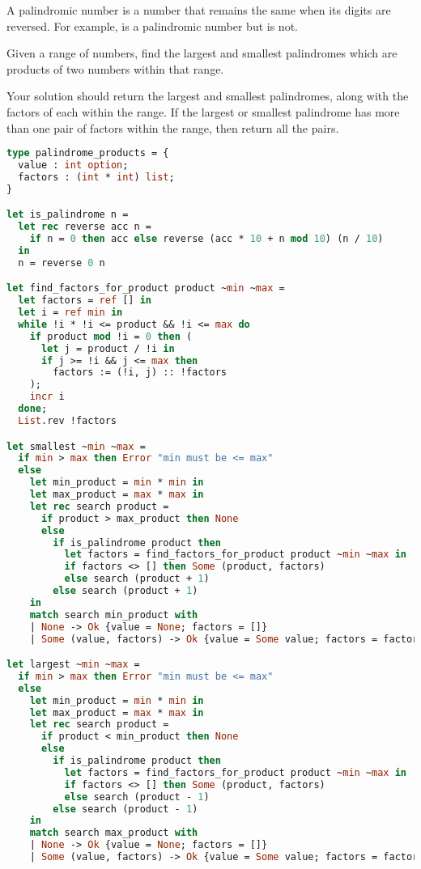 A palindromic number is a number that remains the same when its digits are reversed.
For example,  is a palindromic number but  is not.

Given a range of numbers, find the largest and smallest palindromes which
are products of two numbers within that range.

Your solution should return the largest and smallest palindromes, along with the factors of each within the range.
If the largest or smallest palindrome has more than one pair of factors within the range, then return all the pairs.

\begin{lstlisting}[language=OCaml]
type palindrome_products = {
  value : int option;
  factors : (int * int) list;
}

let is_palindrome n =
  let rec reverse acc n =
    if n = 0 then acc else reverse (acc * 10 + n mod 10) (n / 10)
  in
  n = reverse 0 n

let find_factors_for_product product ~min ~max =
  let factors = ref [] in
  let i = ref min in
  while !i * !i <= product && !i <= max do
    if product mod !i = 0 then (
      let j = product / !i in
      if j >= !i && j <= max then
        factors := (!i, j) :: !factors
    );
    incr i
  done;
  List.rev !factors

let smallest ~min ~max =
  if min > max then Error "min must be <= max"
  else
    let min_product = min * min in
    let max_product = max * max in
    let rec search product =
      if product > max_product then None
      else
        if is_palindrome product then
          let factors = find_factors_for_product product ~min ~max in
          if factors <> [] then Some (product, factors)
          else search (product + 1)
        else search (product + 1)
    in
    match search min_product with
    | None -> Ok {value = None; factors = []}
    | Some (value, factors) -> Ok {value = Some value; factors = factors}

let largest ~min ~max =
  if min > max then Error "min must be <= max"
  else
    let min_product = min * min in
    let max_product = max * max in
    let rec search product =
      if product < min_product then None
      else
        if is_palindrome product then
          let factors = find_factors_for_product product ~min ~max in
          if factors <> [] then Some (product, factors)
          else search (product - 1)
        else search (product - 1)
    in
    match search max_product with
    | None -> Ok {value = None; factors = []}
    | Some (value, factors) -> Ok {value = Some value; factors = factors}
\end{lstlisting}

